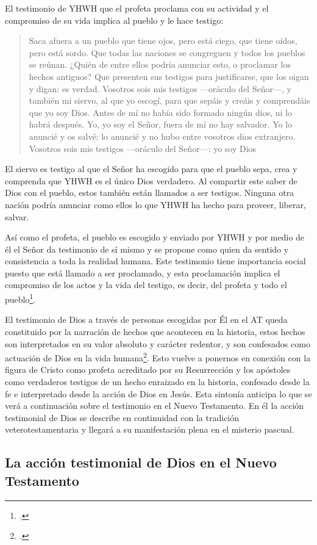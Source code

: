 El testimonio de YHWH que el profeta proclama con su actividad y el compromiso de su vida implica al pueblo y le hace testigo: \blockquote[][\,(Is 43,8-12)]{Saca afuera a un pueblo que tiene ojos, pero está ciego, que tiene oídos, pero está sordo. Que todas las naciones se congreguen y todos los pueblos se reúnan. ¿Quién de entre ellos podría anunciar esto, o proclamar los hechos antiguos? Que presenten sus testigos para justificarse, que los oigan y digan: es verdad. Vosotros sois mis testigos ---oráculo del Señor---, y también mi siervo, al que yo escogí, para que sepáis y creáis y comprendáis que yo soy Dios. Antes de mí no había sido formado ningún dios, ni lo habrá después. Yo, yo soy el Señor, fuera de mí no hay salvador. Yo lo anuncié y os salvé; lo anuncié y no hubo entre vosotros dios extranjero. Vosotros sois mis testigos ---oráculo del Señor---: yo soy Dios}. El siervo es testigo al que el Señor ha escogido para que el pueblo sepa, crea y comprenda que YHWH es el único Dios verdadero. Al compartir este saber de Dios con el pueblo, estos también están llamados a ser testigos. Ninguna otra nación podría anunciar como ellos lo que YHWH ha hecho para proveer, liberar, salvar.

Así como el profeta, el pueblo es escogido y enviado por YHWH y por medio de él el Señor da testimonio de sí mismo y se propone como quien da sentido y consistencia a toda la realidad humana. Este testimonio tiene importancia social puesto que está llamado a ser proclamado, y esta proclamación implica el compromiso de los actos y la vida del testigo, es decir, del profeta y todo el pueblo\footcite[Cf.][1526-1527]{latourelle2000testimonio}.

El testimonio de Dios a través de personas escogidas por Él en el AT queda constituido por la narración de hechos que acontecen en la historia, estos hechos son interpretados en su valor absoluto y carácter redentor, y son confesados como actuación de Dios en la vida humana\footcite[Cf.][119]{prades2015testimonio}. Esto vuelve a ponernos en conexión con la figura de Cristo como profeta acreditado por su Resurrección y los apóstoles como verdaderos testigos de un hecho enraizado en la historia, confesado desde la fe e interpretado desde la acción de Dios en Jesús. Esta sintonía anticipa lo que se verá a continuación sobre el testimonio en el Nuevo Testamento. En él la acción testimonial de Dios se describe en continuidad con la tradición veterotestamentaria y llegará a su manifestación plena en el misterio pascual.

\subsection{La acción testimonial de Dios en el Nuevo Testamento}

